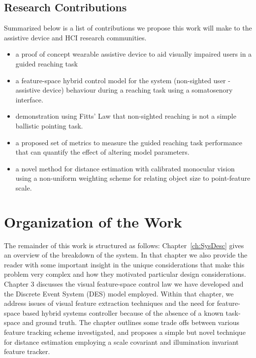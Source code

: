 \subsection{Research Contributions}\label{ch:Introduction:sec:ResearchGoal:ssec:Contributions}
Summarized below is a list of contributions we propose this work will make to the assistive device and HCI research communities.
\begin{itemize}
\item a proof of concept wearable assistive device to aid visually impaired users in a guided reaching task
\item a feature-space hybrid control model for the system (non-sighted user - assistive device) behaviour during a reaching task using a somatosenory interface.
\item demonstration using Fitts' Law that non-sighted reaching is not a simple ballistic pointing task.
\item a proposed set of metrics to measure the guided reaching task performance that can quantify the effect of altering model parameters.
\item a novel method for distance estimation with calibrated monocular vision using a non-uniform weighting scheme for relating object size to point-feature scale.
\end{itemize}

\section{Organization of the Work}\label{ch:Introdution:sec:Organization}

The remainder of this work is structured as follows: Chapter~\ref{ch:SysDesc} gives an overview of the breakdown of the system. In that chapter we also provide the reader with some important insight in the unique considerations that make this problem very complex and how they motivated particular design considerations.  Chapter 3 discusses the visual feature-space control law we have developed and the Discrete Event System (DES) model employed.  Within that chapter, we address issues of visual feature extraction techniques and the need for feature-space based hybrid systems controller because of the absence of a known task-space and ground truth.  The chapter outlines some trade offs between various feature tracking scheme investigated, and proposes a simple but novel technique for distance estimation employing a scale covariant and illumination invariant feature tracker.

